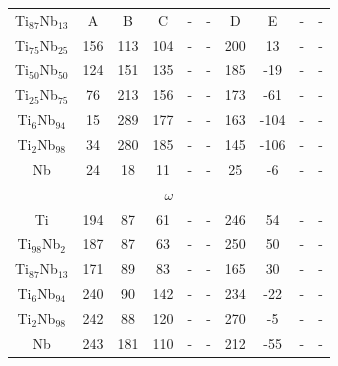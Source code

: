 \begin{longtable}[H]{ c c c c c c c c c c }
	Ti$_{87}$Nb$_{13}$ & A & B & C & - & - & D & E & - & - \\
	Ti$_{75}$Nb$_{25}$ & 156 & 113 & 104 & - & - & 200 & 13 & - & - \\
	Ti$_{50}$Nb$_{50}$ & 124 & 151 & 135 & - & - & 185 & -19 & - & - \\
	Ti$_{25}$Nb$_{75}$ & 76 & 213 & 156 & - & - & 173 & -61 & - & - \\
	Ti$_{6}$Nb$_{94}$ & 15 & 289 & 177 & - & - & 163 & -104 & - & - \\
	Ti$_{2}$Nb$_{98}$ & 34 & 280 & 185 & - & - & 145 & -106 & - & - \\
	Nb & 24 & 18 & 11 & - & - & 25 & -6 & - & - \\
	\hline
	\multicolumn{10}{c}{$\omega$}\\
	Ti & 194 & 87 & 61 & - & - & 246 & 54 & - & - \\
	Ti$_{98}$Nb$_{2}$ & 187 & 87 & 63 & - & - & 250 & 50 & - & - \\
	Ti$_{87}$Nb$_{13}$ & 171 & 89 & 83 & - & - & 165 & 30 & - & - \\
	Ti$_{6}$Nb$_{94}$ & 240 & 90 & 142 & - & - & 234 & -22 & - & - \\
	Ti$_{2}$Nb$_{98}$ & 242 & 88 & 120 & - & - & 270 & -5 & - & - \\
	Nb & 243 & 181 & 110 & - & - & 212 & -55 & - & - \\
	\hline
\end{longtable}

